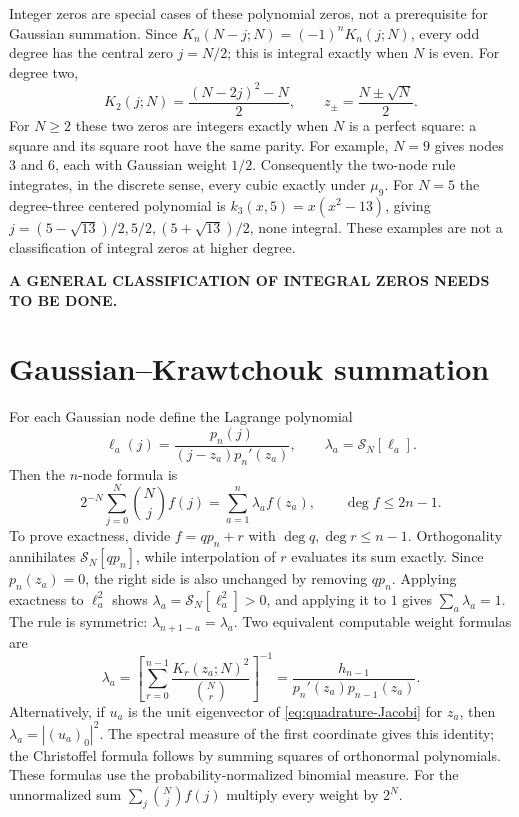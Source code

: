 Integer zeros are special cases of these polynomial zeros, not a prerequisite for Gaussian summation. Since
$K_n(N-j;N)=(-1)^nK_n(j;N)$, every odd degree has the central zero $j=N/2$; this is integral exactly when $N$ is even. For degree two,
\[
K_2(j;N)=\frac{(N-2j)^2-N}{2},\qquad
z_\pm=\frac{N\pm\sqrt N}{2}.
\]
For $N\ge2$ these two zeros are integers exactly when $N$ is a perfect square: a square and its square root have the same parity. For example, $N=9$ gives nodes $3$ and $6$, each with Gaussian weight $1/2$. Consequently the two-node rule integrates, in the discrete sense, every cubic exactly under $\mu_9$.
For $N=5$ the degree-three centered polynomial is $k_3(x,5)=x(x^2-13)$, giving $j=(5-\sqrt{13})/2,5/2,(5+\sqrt{13})/2$, none integral.
These examples are not a classification of integral zeros at higher degree.
\par\noindent\textbf{A GENERAL CLASSIFICATION OF INTEGRAL ZEROS NEEDS TO BE DONE.}

\section{Gaussian--Krawtchouk summation}
\label{sec:17-3}
For each Gaussian node define the Lagrange polynomial
\[
\ell_a(j)=\frac{p_n(j)}{(j-z_a)p_n'(z_a)},\qquad
\lambda_a=\mathcal S_N[\ell_a].
\]
Then the $n$-node formula is
\begin{equation}\label{eq:gaussian-Krawtchouk-sum}
2^{-N}\sum_{j=0}^N\binom Nj f(j)
=\sum_{a=1}^n\lambda_a f(z_a),\qquad \deg f\le2n-1.
\end{equation}
To prove exactness, divide $f=q p_n+r$ with $\deg q,\deg r\le n-1$. Orthogonality annihilates $\mathcal S_N[q p_n]$, while interpolation of $r$ evaluates its sum exactly. Since $p_n(z_a)=0$, the right side is also unchanged by removing $q p_n$.
Applying exactness to $\ell_a^2$ shows
$\lambda_a=\mathcal S_N[\ell_a^2]>0$, and applying it to $1$ gives $\sum_a\lambda_a=1$. The rule is symmetric: $\lambda_{n+1-a}=\lambda_a$.
Two equivalent computable weight formulas are
\begin{equation}\label{eq:quadrature-Christoffel}
\lambda_a=\left[\sum_{r=0}^{n-1}\frac{K_r(z_a;N)^2}{\binom Nr}\right]^{-1}
=\frac{h_{n-1}}{p_n'(z_a)p_{n-1}(z_a)}.
\end{equation}
Alternatively, if $u_a$ is the unit eigenvector of \eqref{eq:quadrature-Jacobi} for $z_a$, then $\lambda_a=|(u_a)_0|^2$. The spectral measure of the first coordinate gives this identity; the Christoffel formula follows by summing squares of orthonormal polynomials. These formulas use the probability-normalized binomial measure. For the unnormalized sum $\sum_j\binom Nj f(j)$ multiply every weight by $2^N$.

